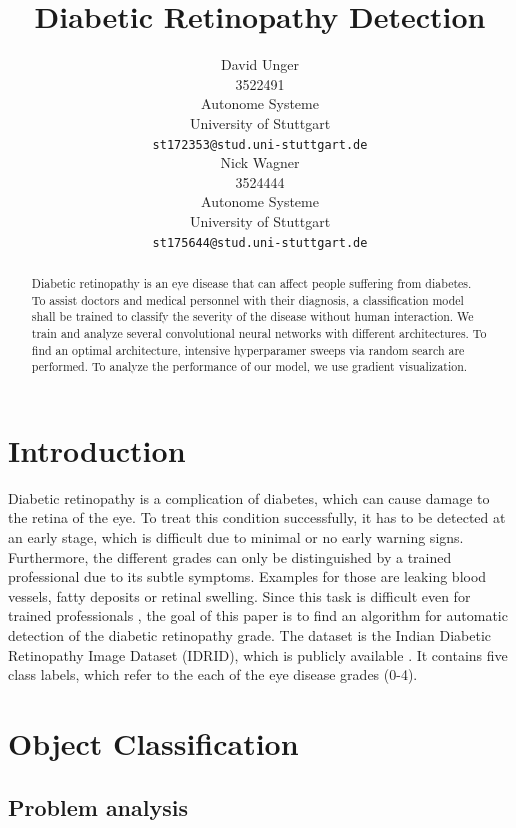 \documentclass{article}
\title{Diabetic Retinopathy Detection}
\author{
  David Unger\\
  3522491 \\
  Autonome Systeme\\
  University of Stuttgart\\
  \texttt{st172353@stud.uni-stuttgart.de} \\
  \And
  Nick Wagner\\
  3524444 \\
  Autonome Systeme\\
  University of Stuttgart\\
  \texttt{st175644@stud.uni-stuttgart.de} \\
}
\begin{document}
\maketitle

\begin{abstract}
Diabetic retinopathy is an eye disease that can affect people suffering from diabetes. To assist 
doctors and medical personnel with their diagnosis, a classification model shall be trained to classify the severity 
of the disease without human interaction. 
We train and analyze several convolutional neural networks with different architectures. To find an optimal architecture, 
intensive hyperparamer sweeps via random search are performed. To analyze the performance of our model, we use gradient 
visualization.
\end{abstract}

\section{Introduction}
Diabetic retinopathy is a complication of diabetes, which can cause damage to the retina of the eye.
To treat this condition successfully, it has to be detected at an early stage, which is difficult due to minimal or no early warning signs. 
Furthermore, the different grades can only be distinguished by a trained professional due to its subtle symptoms.
Examples for those are leaking blood vessels, fatty deposits or retinal swelling.
Since this task is difficult even for trained professionals \cite{DBRscience}, the goal of this paper is to find an algorithm for automatic
detection of the diabetic retinopathy grade. The dataset is the Indian Diabetic Retinopathy Image Dataset (IDRID), which 
is publicly available \cite{IDRiDdataset}. It contains five class labels, which refer to the each of the eye disease grades (0-4).

\section{Object Classification}
\subsection{Problem analysis}
\end{document}
